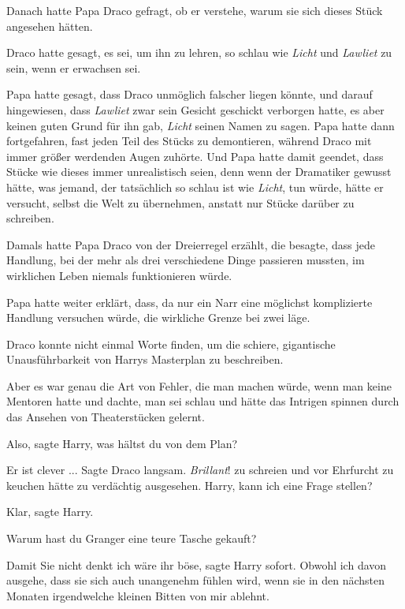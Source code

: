 Danach hatte Papa Draco gefragt, ob er verstehe, warum sie sich dieses Stück
angesehen hätten.

Draco hatte gesagt, es sei, um ihn zu lehren, so schlau wie \emph{Licht} und
\emph{Lawliet} zu sein, wenn er erwachsen sei.

Papa hatte gesagt, dass Draco unmöglich falscher liegen könnte, und darauf
hingewiesen, dass \emph{Lawliet} zwar sein Gesicht geschickt verborgen hatte, es
aber keinen guten Grund für ihn gab, \emph{Licht} seinen Namen zu sagen. Papa
hatte dann fortgefahren, fast jeden Teil des Stücks zu demontieren, während
Draco mit immer größer werdenden Augen zuhörte. Und Papa hatte damit geendet,
dass Stücke wie dieses immer unrealistisch seien, denn wenn der Dramatiker
gewusst hätte, was jemand, der tatsächlich so schlau ist wie \emph{Licht}, tun
würde, hätte er versucht, selbst die Welt zu übernehmen, anstatt nur Stücke
darüber zu schreiben.

Damals hatte Papa Draco von der Dreierregel erzählt, die besagte, dass jede
Handlung, bei der mehr als drei verschiedene Dinge passieren mussten, im
wirklichen Leben niemals funktionieren würde.

Papa hatte weiter erklärt, dass, da nur ein Narr eine möglichst komplizierte
Handlung versuchen würde, die wirkliche Grenze bei zwei läge.

Draco konnte nicht einmal Worte finden, um die schiere, gigantische
Unausführbarkeit von Harrys Masterplan zu beschreiben.

Aber es war genau die Art von Fehler, die man machen würde, wenn man keine
Mentoren hatte und dachte, man sei schlau und hätte das Intrigen spinnen durch
das Ansehen von Theaterstücken gelernt.

\glqq{}Also\grqq{}, sagte Harry, \glqq{}was hältst du von dem Plan?\grqq{}

\glqq{}Er ist clever ...\grqq{} Sagte Draco langsam. \emph{Brillant}! zu schreien
und vor Ehrfurcht zu keuchen hätte zu verdächtig ausgesehen. \glqq{}Harry, kann
ich eine Frage stellen?\grqq{}

\glqq{}Klar\grqq{}, sagte Harry.

\glqq{}Warum hast du Granger eine teure Tasche gekauft?\grqq{}

\glqq{}Damit Sie nicht denkt ich wäre ihr böse\grqq{}, sagte Harry sofort. \glqq{}
Obwohl ich davon ausgehe, dass sie sich auch unangenehm fühlen wird, wenn sie in
den nächsten Monaten irgendwelche kleinen Bitten von mir ablehnt.\grqq{}

